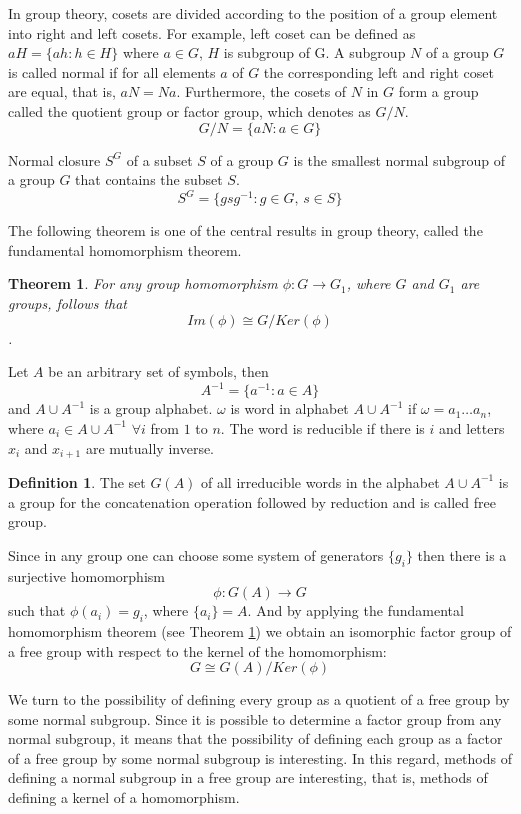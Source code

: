\documentclass[conference]{IEEEtran}
\newtheorem{thm}{Theorem}[section]
\theoremstyle{definition}
\newtheorem{defn}{Definition}[section]
\begin{document}
In group theory, cosets are divided according to the position of a group element
into right and left cosets. For example, left coset can be defined as $aH = \{ ah : h \in H \}$
where $a \in G$, $H$ is subgroup of G.
A subgroup $N$ of a group $G$ is called normal if for all
elements $a$ of $G$ the corresponding left and right coset are equal,
that is, $aN = Na$. Furthermore, the cosets of $N$ in $G$ form a group
called the quotient group or factor group, which denotes as $G/N$.
$$G/N = \{aN : a \in G\}$$

Normal closure $S^G$ of a subset $S$ of a group $G$ is the smallest normal subgroup
of a group $G$ that contains the subset $S$.
$$S^G = \{ gsg^{-1} : g \in G,\, s \in S \}$$

The following theorem is one of the central results in group theory, called the fundamental homomorphism theorem.

\begin{thm} \label{fhtm}
For any group homomorphism $\phi: G \to G_1$, where $G$ and $G_1$ are groups, follows that
$$Im(\phi) \cong G/Ker(\phi)$$.
\end{thm}

Let $ A $ be an arbitrary set of symbols, then $$A^{-1} = \{ a^{-1} : a \in A \}$$ and $A \cup A^{-1}$ is a group alphabet.
$\omega$ is word in alphabet $A \cup A^{-1}$ if $\omega = a_1 \dots a_n$,
where $a_i \in A \cup A^{-1}$ $\forall i$ from $1$ to $n$.
The word is reducible if there is $i$ and letters $x_i$ and $x_{i+1}$ are mutually inverse.

\begin{defn}
The set $G(A)$ of all irreducible words in the alphabet $A \cup A^{-1}$
is a group for the concatenation operation followed by reduction and is called free group.
\end{defn}

Since in any group one can choose some system of generators $\{ g_i \}$ then there
is a surjective homomorphism $$\phi: G(A) \to G$$ such that $\phi(a_i) = g_i$,
where $\{a_i\} = A$. And by applying the fundamental homomorphism theorem (see Theorem \ref{fhtm}) we obtain an isomorphic factor group of a free group with respect to the kernel of the homomorphism:
$$G \cong G(A)/Ker(\phi)$$ 

We turn to the possibility of defining every group
as a quotient of a free group by some normal subgroup.
Since it is possible to determine a factor group from any normal subgroup, it means that the possibility of defining each group as a factor of a free group by some normal subgroup is interesting. In this regard, methods of defining a normal subgroup in a free group are interesting, that is, methods of defining a kernel of a homomorphism.
\end{document}
